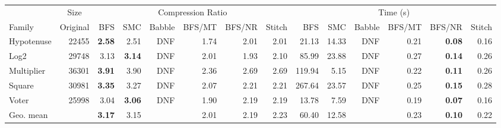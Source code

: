 \begin{tabular}{l r rrrrrr rrrrrr}
\toprule
& \multicolumn{1}{c}{Size} & \multicolumn{6}{c}{Compression Ratio} & \multicolumn{6}{c}{Time (s)} \\
\cmidrule(lr){2-2} \cmidrule(lr){3-8} \cmidrule(lr){9-14}
Family & Original & BFS & SMC & Babble & BFS/MT & BFS/NR & Stitch & BFS & SMC & Babble & BFS/MT & BFS/NR & Stitch \\
\midrule
Hypotenuse & 22455 & \textbf{2.58} & 2.51 & DNF & 1.74 & 2.01 & 2.01 & 21.13 & 14.33 & DNF & 0.21 & \textbf{0.08} & 0.16 \\
Log2 & 29748 & 3.13 & \textbf{3.14} & DNF & 2.01 & 1.93 & 2.10 & 85.99 & 23.88 & DNF & 0.27 & \textbf{0.14} & 0.26 \\
Multiplier & 36301 & \textbf{3.91} & 3.90 & DNF & 2.36 & 2.69 & 2.69 & 119.94 & 5.15 & DNF & 0.22 & \textbf{0.11} & 0.26 \\
Square & 30981 & \textbf{3.35} & 3.27 & DNF & 2.07 & 2.21 & 2.21 & 267.64 & 23.57 & DNF & 0.25 & \textbf{0.15} & 0.28 \\
Voter & 25998 & 3.04 & \textbf{3.06} & DNF & 1.90 & 2.19 & 2.19 & 13.78 & 7.59 & DNF & 0.19 & \textbf{0.07} & 0.16 \\
\midrule
Geo. mean &  & \textbf{3.17} & 3.15 &  & 2.01 & 2.19 & 2.23 & 60.40 & 12.58 &  & 0.23 & \textbf{0.10} & 0.22 \\
\bottomrule
\end{tabular}
